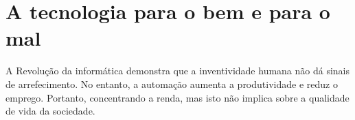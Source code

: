 \section{A tecnologia para o bem e para o mal}

A Revolução da informática demonstra que a inventividade humana não dá sinais de arrefecimento.
No entanto, a automação aumenta a produtividade e reduz o emprego.
Portanto, concentrando a renda, mas isto não implica sobre a qualidade de vida da sociedade.
 